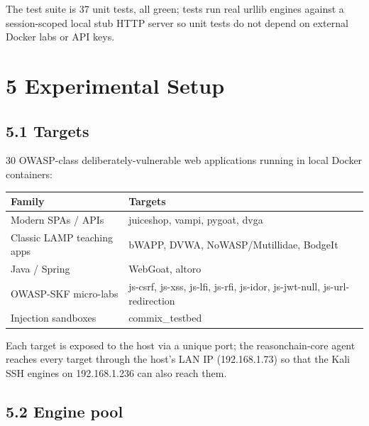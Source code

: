 \documentclass[
]{article}
\newcounter{none} %
\begin{document}
The test suite is 37 unit tests, all green; tests run real urllib
engines against a session-scoped local stub HTTP server so unit tests do
not depend on external Docker labs or API keys.

\section{5 Experimental Setup}\label{experimental-setup}

\subsection{5.1 Targets}\label{targets}

30 OWASP-class deliberately-vulnerable web applications running in local
Docker containers:

{\def\LTcaptype{none} %
\begin{longtable}[]{@{}
  >{\raggedright\arraybackslash}p{}
  >{\raggedright\arraybackslash}p{}@{}}
\toprule\noalign{}
\begin{minipage}[b]{\linewidth}\raggedright
Family
\end{minipage} & \begin{minipage}[b]{\linewidth}\raggedright
Targets
\end{minipage} \\
\midrule\noalign{}
\endhead
\bottomrule\noalign{}
\endlastfoot
Modern SPAs / APIs & juiceshop, vampi, pygoat, dvga \\
Classic LAMP teaching apps & bWAPP, DVWA, NoWASP/Mutillidae, BodgeIt \\
Java / Spring & WebGoat, altoro \\
OWASP-SKF micro-labs & js-csrf, js-xss, js-lfi, js-rfi, js-idor,
js-jwt-null, js-url-redirection \\
Injection sandboxes & commix\_testbed \\
\end{longtable}
}

Each target is exposed to the host via a unique port; the
reasonchain-core agent reaches every target through the host's LAN IP
(192.168.1.73) so that the Kali SSH engines on 192.168.1.236 can also
reach them.

\subsection{5.2 Engine pool}\label{engine-pool}
\end{document}
